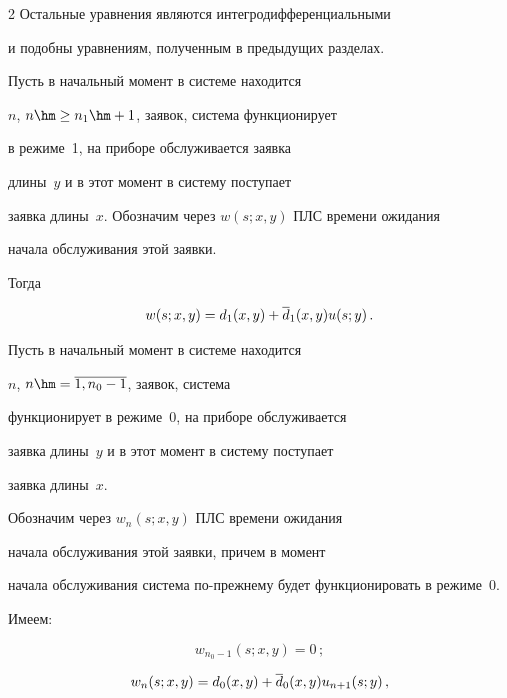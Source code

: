 \begin{multicols}{2}
Остальные уравнения являются интегродифференциальными


и подобны уравнениям, полученным в предыдущих разделах.





Пусть в начальный момент в системе находится


$n$, $n\hm\ge n_1\hm+1$, заявок, система функционирует


в режиме~1, на приборе обслуживается заявка


длины~$y$ и в этот момент в систему поступает


заявка длины~$x$. Обозначим через $w(s;x,y)$ ПЛС времени ожидания


начала обслуживания этой заявки.


Тогда


$$


w(s;x,y) = d_1(x,y) + \d_1(x,y) u(s;y) \,.


$$





Пусть в начальный момент в системе находится


$n$, $n\hm=\overline{1,n_0-1}$, заявок, система


функционирует в режиме~0, на приборе обслуживается


заявка длины~$y$ и в этот момент в систему поступает


заявка длины~$x$.


Обозначим через $w_n(s;x,y)$ ПЛС времени ожидания


начала обслуживания этой заявки, причем в момент


начала обслуживания система по-преж\-не\-му будет функционировать в режиме~0.


Имеем:


$$


w_{n_0-1}(s;x,y) = 0\,;


$$







\vspace*{-24pt}





\noindent


\begin{multline*}


w_n(s;x,y) = d_0(x,y) + \d_0(x,y) u_{n+1}(s;y)\, ,\\  



\end{multline*}
\end{multicols}
